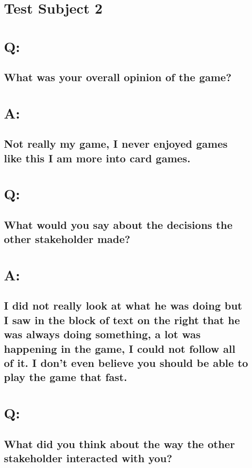 \newpage

\section*{Test Subject 2}

\section*{Q:}
\subsection*{What was your overall opinion of the game?}

\section*{A:}
\subsection*{Not really my game, I never enjoyed games like this I am more into card games.}

\section*{Q:} 
\subsection*{What would you say about the decisions the other stakeholder made?}

\section*{A:}
\subsection*{I did not really look at what he was doing but I saw in the block of text on the right that he was always doing something, a lot was happening in the game, I could not follow all of it. I don't even believe you should be able to play the game that fast.}

\section*{Q:}
\subsection*{What did you think about the way the other stakeholder interacted with you?}

